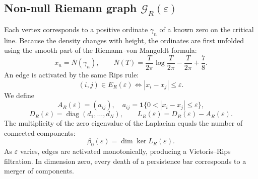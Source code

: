 \documentclass[11pt]{amsart}
\theoremstyle{definition}
\theoremstyle{remark}
\begin{document}
\subsection{Non-null Riemann graph $\mathcal G_R(\varepsilon)$}
Each vertex corresponds to a positive ordinate $\gamma_n$ of a known zero on the critical line. Because the density changes with height, the ordinates are first unfolded using the smooth part of the Riemann--von Mangoldt formula:
\begin{equation}\label{eq:unfold}
 x_n=\overline N(\gamma_n),\qquad
 \overline N(T)=\frac{T}{2\pi}\log\frac{T}{2\pi}-\frac{T}{2\pi}+\frac78.
\end{equation}
An edge is activated by the same Rips rule:
\begin{equation}\label{eq:riemannedge}
 (i,j)\in E_R(\varepsilon)
 \iff |x_i-x_j|\le\varepsilon.
\end{equation}
We define
\begin{equation}
 A_R(\varepsilon)=(a_{ij}),\quad
 a_{ij}=\mathbf 1\{0<|x_i-x_j|\le\varepsilon\},
\end{equation}
\begin{equation}
 D_R(\varepsilon)=\operatorname{diag}(d_1,\ldots,d_N),\qquad
 L_R(\varepsilon)=D_R(\varepsilon)-A_R(\varepsilon).
\end{equation}
The multiplicity of the zero eigenvalue of the Laplacian equals the number of connected components:
\begin{equation}\label{eq:beta0}
 \beta_0(\varepsilon)=\dim\ker L_R(\varepsilon).
\end{equation}
As $\varepsilon$ varies, edges are activated monotonically, producing a Vietoris--Rips filtration. In dimension zero, every death of a persistence bar corresponds to a merger of components.
\end{document}
